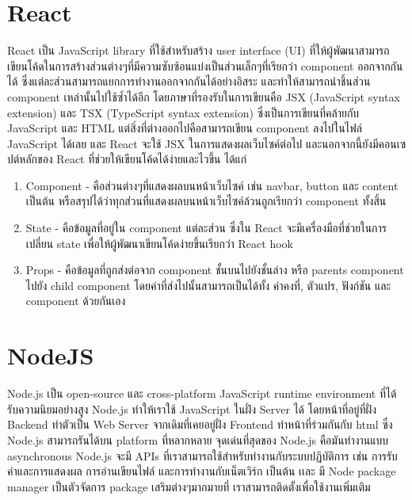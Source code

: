\section{React}
React\cite{react} เป็น JavaScript library ที่ใช้สำหรับสร้าง user interface (UI) ที่ให้ผู้พัฒนาสามารถเขียนโค้ดในการสร้างส่วนต่างๆที่มีความซับซ้อนแบ่งเป็นส่วนเล็กๆที่เรียกว่า component ออกจากกันได้ ซึ่งแต่ละส่วนสามารถแยกการทำงานออกจากกันได้อย่างอิสระ และทำให้สามารถนำชิ้นส่วน component เหล่านั้นไปใช้ซ้ำได้อีก โดยภาษาที่รองรับในการเขียนคือ JSX (JavaScript syntax extension) และ TSX (TypeScript syntax extension) 
ซึ่งเป็นการเขียนที่คล้ายกับ JavaScript และ HTML แต่สิ่งที่ต่างออกไปคือสามารถเขียน component ลงไปในไฟล์ JavaScript ได้เลย และ React จะใช้ JSX ในการแสดงผลเว็บไซค์ต่อไป และนอกจากนี้ยังมีคอนเซปต์หลักของ React ที่ช่วยให้เขียนโค้ดได้ง่ายและไวขึ้น ได้แก่
\begin{enumerate}
  \item Component - คือส่วนต่างๆที่แสดงผลบนหน้าเว็บไซค์ เช่น navbar, button และ content เป็นต้น 
  หรือสรุปได้ว่าทุกส่วนที่แสดงผลบนหน้าเว็บไซค์ล้วนถูกเรียกว่า component ทั้งสิ้น
  \item State - คือข้อมูลที่อยู่ใน component แต่ละส่วน ซึ่งใน React จะมีเครื่องมือที่ช่วยในการเปลี่ยน state 
  เพื่อให้ผู้พัฒนาเขียนโค้ดง่ายขึ้นเรียกว่า React hook
  \item Props - คือข้อมูลที่ถูกส่งต่อจาก component ชั้นบนไปยังชั้นล่าง หรือ parents component ไปยัง child component 
  โดยค่าที่ส่งไปนั้นสามารถเป็นได้ทั้ง ค่าคงที่, ตัวแปร, ฟังก์ชัน และ component ด้วยกันเอง 
\end{enumerate}

\section{NodeJS}
Node.js\cite{node} เป็น open-source และ cross-platform JavaScript runtime environment 
ที่ได้รับความนิยมอย่างสูง Node.js ทำให้เราใช้ JavaScript ในฝั่ง Server ได้ 
โดยหน้าที่อยู่ที่ฝั่ง Backend ทำตัวเป็น Web Server จากเดิมที่เคยอยู่ฝั่ง Frontend ทำหน้าที่ร่วมกันกับ html
ซึ่ง Node.js สามารถรันได้บน platform ที่หลากหลาย
จุดเด่นที่สุดของ Node.js คือมันทำงานแบบ asynchronous Node.js จะมี APIs ที่เราสามารถใช้สำหรับทำงานกับระบบปฏิบัติการ 
เช่น การรับค่าและการแสดงผล การอ่านเขียนไฟล์ และการทำงานกับเน็ตเวิร์ก เป็นต้น เเละ มี Node package manager เป็นตัวจัดการ package เสริมต่างๆมากมายที่
เราสามารถติดตั้งเพื่อใช้งานเพิ่มเติม


